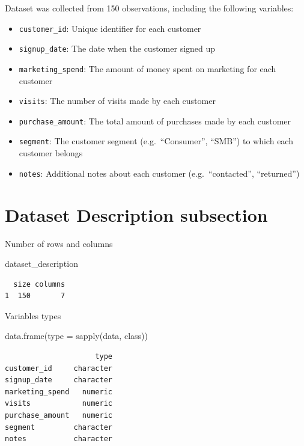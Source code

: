 \documentclass[
  letterpaper,
  DIV=11,
  numbers=noendperiod]{scrartcl}
\newenvironment{Shaded}{\begin{snugshade}}{\end{snugshade}}
\newcommand{\AttributeTok}[1]{\textcolor[rgb]{0.40,0.45,0.13}{#1}}
\newcommand{\FunctionTok}[1]{\textcolor[rgb]{0.28,0.35,0.67}{#1}}
\newcommand{\NormalTok}[1]{\textcolor[rgb]{0.00,0.23,0.31}{#1}}
\begin{document}
Dataset was collected from 150 observations, including the following
variables:

\begin{itemize}
\item
  \texttt{customer\_id}: Unique identifier for each customer
\item
  \texttt{signup\_date}: The date when the customer signed up
\item
  \texttt{marketing\_spend}: The amount of money spent on marketing for
  each customer
\item
  \texttt{visits}: The number of visits made by each customer
\item
  \texttt{purchase\_amount}: The total amount of purchases made by each
  customer
\item
  \texttt{segment}: The customer segment (e.g.~``Consumer'', ``SMB'') to
  which each customer belongs
\item
  \texttt{notes}: Additional notes about each customer
  (e.g.~``contacted'', ``returned'')
\end{itemize}

\section{Dataset Description
subsection}\label{dataset-description-subsection}

Number of rows and columns

\begin{Shaded}
\begin{Highlighting}[]
\NormalTok{dataset\_description}
\end{Highlighting}
\end{Shaded}

\begin{verbatim}
  size columns
1  150       7
\end{verbatim}

Variables types

\begin{Shaded}
\begin{Highlighting}[]
\FunctionTok{data.frame}\NormalTok{(}\AttributeTok{type =} \FunctionTok{sapply}\NormalTok{(data, class))}
\end{Highlighting}
\end{Shaded}

\begin{verbatim}
                     type
customer_id     character
signup_date     character
marketing_spend   numeric
visits            numeric
purchase_amount   numeric
segment         character
notes           character
\end{verbatim}
\end{document}
